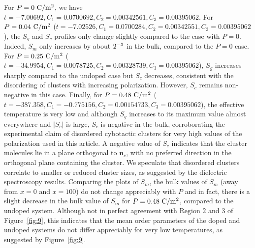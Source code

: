 \documentclass[reprint,amsfonts,amsmath,amssymb,aps,pre,floatfix,10pt]{revtex4-1}
\newcommand\n{\mathbf{n}}
\begin{document}
For $P = 0 ~\rm{C} / \rm{m}^2$, we have $t =-7.00692, C_1 =0.0700692, C_2 =0.00342561, C_3 =0.00395062$.
For $P = 0.04 ~ \rm{C} / \rm{m}^2$ ($t =-7.02526, C_1 =0.0700284, C_2 =0.00342551, C_3 =0.00395062$), the $S_g$ and $S_c$ profiles only change slightly compared to the case with $P = 0$. Indeed, $S_m$ only increases by about $2 \time 10^{-3}$ in the bulk, compared to the $P=0$ case. For $P = 0.25 ~ \rm{C} / \rm{m}^2$ ($t =-34.9954, C_1 =0.0078725, C_2 =0.00328739, C_3 =0.00395062$), $S_g$ increases sharply compared to the undoped case but $S_c$ decreases, consistent with the disordering of clusters with increasing polarization. However, $S_c$ remains non-negative in this case.  Finally, for $P = 0.48 ~ \rm{C}/\rm{m}^2$ ($t =-387.358, C_1 =-0.775156, C_2 =0.00154733, C_3 =0.00395062$), the effective temperature is very low and although $S_g$ increases to its maximum value almost everywhere and $|S_c|$ is large, $S_c$ is negative in the bulk, corroborating the experimental claim of disordered cybotactic clusters for very high values of the polarization used in this article. A negative value of $S_c$ indicates that the cluster molecules lie in a plane orthogonal to $\n_c$, with no preferred direction in the orthogonal plane containing the cluster. We speculate that disordered clusters correlate to smaller or reduced cluster sizes, as suggested by the dielectric spectroscopy results. Comparing the plots of $S_m$, the bulk values of $S_m$  (away from $x=0$ and $x=100$) do not change appreciably with $P$ and in fact, there is a slight decrease in the bulk value of $S_m$ for $P= 0.48 ~ \rm{C}/\rm{m}^2$, compared to the undoped system. Although not in perfect agreement with Region $2$ and $3$ of Figure~\ref{fig:9}, this indicates that the mean order parameters of the doped and undoped systems do not differ appreciably for very low temperatures, as suggested by Figure~\ref{fig:9}.
\end{document}
